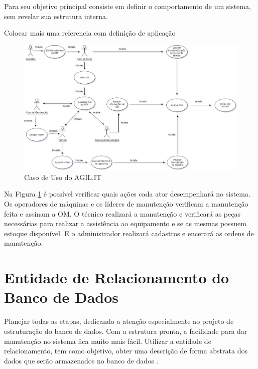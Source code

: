 {{{			Para \cite{carniello2003} seu objetivo principal consiste em definir o comportamento de um sistema, sem revelar sua estrutura interna.}
		
		{\color{red} Colocar mais uma referencia com definição de aplicação}
		
		\begin{figure}[htb]
			\caption{\label{caso_uso}Caso de Uso do AGIL.IT}
			\begin{center}
				\includegraphics[scale=0.57]{./Figuras/caso-uso.png}
			\end{center}
		\end{figure}
		
		Na Figura \ref{caso_uso} é possível verificar quais ações cada ator desempenhará no sistema. Os operadores de máquinas e os líderes de manutenção verificam a manutenção feita e assinam a OM. O técnico realizará a manutenção e verificará as peças necessárias para realizar a assistência ao equipamento e se as mesmas possuem estoque disponível. E o administrador realizará cadastros e encerará as ordens de manutenção.
		
		
		\section{Entidade de Relacionamento do Banco de Dados}
		
		{Planejar todas as etapas, dedicando a atenção especialmente ao projeto de estruturação do banco de dados. Com a estrutura pronta, a facilidade para dar manutenção no sistema fica muito mais fácil.
			Utilizar a entidade de relacionamento, tem como objetivo, obter uma descrição de forma abstrata dos dados que serão armazenados no banco de dados \cite{2010_erbd}. }
		
}}

